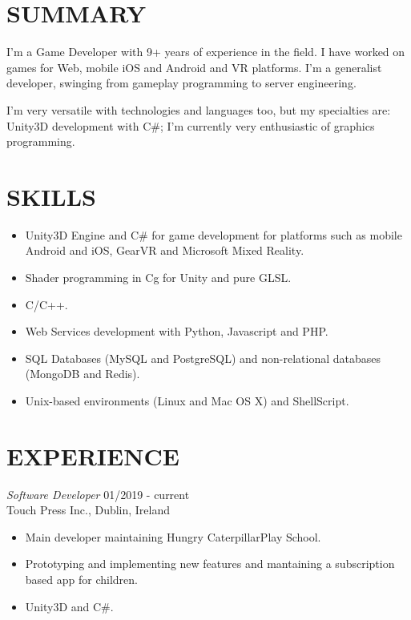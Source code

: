 \documentclass[line,margin]{res}
\begin{document}

\address{56 Phibsboro Rd. - Dublin 7, Dublin, Ireland}
\address{+353 083 486 3449 - bruno@croci.me - \href{https://bruno.croci.me/}{https://bruno.croci.me/}}

 
\begin{resume}
 
\section{SUMMARY} I'm a Game Developer with 9+ years of experience in the field. I have worked on games for Web, mobile iOS and Android and VR platforms. I'm a generalist developer, swinging from gameplay programming to server engineering.

I'm very versatile with technologies and languages too, but my specialties are: Unity3D development with C\#; I'm currently very enthusiastic of graphics programming.
 
\section{SKILLS} \begin{itemize}  \itemsep 1.25pt
		 \item Unity3D Engine and C\# for game development for platforms such as mobile Android and iOS, GearVR and Microsoft Mixed Reality.
		 \item Shader programming in Cg for Unity and pure GLSL.
                 \item C/C++.
		 \item Web Services development with Python, Javascript and PHP.
		 \item SQL Databases (MySQL and PostgreSQL) and non-relational databases (MongoDB and Redis).
                 \item Unix-based environments (Linux and Mac OS X) and ShellScript.
                 \end{itemize}
 
\section{EXPERIENCE} {\sl Software Developer} \hfill 01/2019 - current \\
		Touch Press Inc., Dublin, Ireland
                 \begin{itemize}  \itemsep 1.25pt
                 \item Main developer maintaining Hungry Caterpillar\texttrademark  Play School.
                 \item Prototyping and implementing new features and mantaining a subscription based app for children.
                 \item Unity3D and C\#.
                 \end{itemize}


\end{resume}
\end{document}

